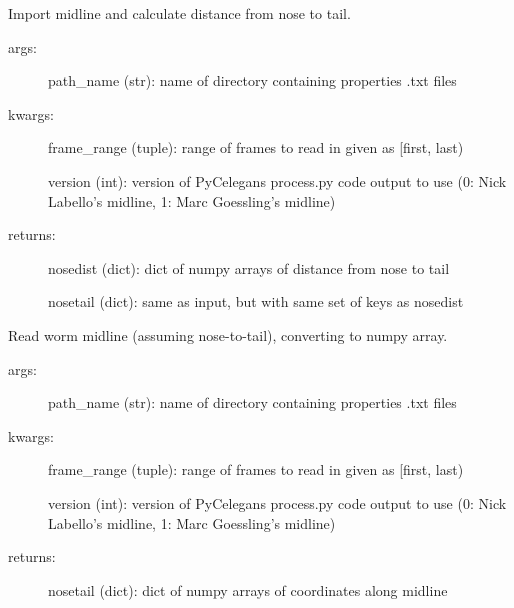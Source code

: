 \documentclass[letterpaper,10pt,openany,oneside]{sphinxmanual}
\begin{document}
\begin{fulllineitems}
\label{index:importdata.main}
Import midline and calculate distance from nose to tail.
\begin{description}
\item[{args:}] \leavevmode
path\_name (str): name of directory containing properties .txt files

\item[{kwargs:}] \leavevmode
frame\_range (tuple): range of frames to read in given as {[}first, last)

version (int): version of PyCelegans process.py code output to use (0: 
Nick Labello's midline, 1: Marc Goessling's midline)

\item[{returns:}] \leavevmode
nosedist (dict): dict of numpy arrays of distance from nose to tail

nosetail (dict): same as input, but with same set of keys as nosedist

\end{description}

\end{fulllineitems}


\begin{fulllineitems}
\label{index:importdata.readnosetail}
Read worm midline (assuming nose-to-tail), converting to numpy array.
\begin{description}
\item[{args:}] \leavevmode
path\_name (str): name of directory containing properties .txt files

\item[{kwargs:}] \leavevmode
frame\_range (tuple): range of frames to read in given as {[}first, last)

version (int): version of PyCelegans process.py code output to use (0: 
Nick Labello's midline, 1: Marc Goessling's midline)

\item[{returns:}] \leavevmode
nosetail (dict): dict of numpy arrays of coordinates along midline

\end{description}

\end{fulllineitems}
\end{document}
